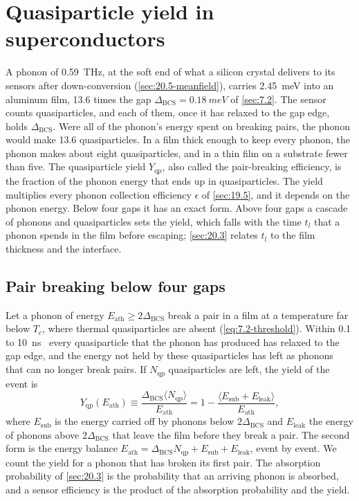 \section{Quasiparticle yield in superconductors}\label{sec:20.4}

A phonon of \SI{0.59}{THz}, at the soft end of what a silicon crystal delivers to its sensors after down-conversion (\cref{sec:20.5-meanfield}), carries \SI{2.45}{meV} into an aluminum film, 13.6 times the gap $\Delta_{\mathrm{BCS}} = \SI{0.18}{meV}$ of \cref{sec:7.2}. The sensor counts quasiparticles, and each of them, once it has relaxed to the gap edge, holds $\Delta_{\mathrm{BCS}}$. Were all of the phonon's energy spent on breaking pairs, the phonon would make 13.6 quasiparticles. In a film thick enough to keep every phonon, the phonon makes about eight quasiparticles, and in a thin film on a substrate fewer than five. The quasiparticle yield $Y_{\mathrm{qp}}$, also called the pair-breaking efficiency, is the fraction of the phonon energy that ends up in quasiparticles. The yield multiplies every phonon collection efficiency $\epsilon$ of \cref{sec:19.5}, and it depends on the phonon energy. Below four gaps it has an exact form. Above four gaps a cascade of phonons and quasiparticles sets the yield, which falls with the time $t_l$ that a phonon spends in the film before escaping; \cref{sec:20.3} relates $t_l$ to the film thickness and the interface.

\subsection{Pair breaking below four gaps}\label{sec:20.4-below}

Let a phonon of energy $E_{\mathrm{ath}} \ge 2\Delta_{\mathrm{BCS}}$ break a pair in a film at a temperature far below $T_c$, where thermal quasiparticles are absent (\cref{eq:7.2-threshold}). Within 0.1 to \SI{10}{ns}~\cite[p.~1]{guruswamy2014quasiparticle} every quasiparticle that the phonon has produced has relaxed to the gap edge, and the energy not held by these quasiparticles has left as phonons that can no longer break pairs. If $N_{\mathrm{qp}}$ quasiparticles are left, the yield of the event is
\begin{equation}
  Y_{\mathrm{qp}}(E_{\mathrm{ath}}) \equiv \frac{\Delta_{\mathrm{BCS}}\langle N_{\mathrm{qp}}\rangle}{E_{\mathrm{ath}}}
  = 1 - \frac{\langle E_{\mathrm{sub}} + E_{\mathrm{leak}}\rangle}{E_{\mathrm{ath}}} ,
  \label{eq:20.4-Y}
\end{equation}
where $E_{\mathrm{sub}}$ is the energy carried off by phonons below $2\Delta_{\mathrm{BCS}}$ and $E_{\mathrm{leak}}$ the energy of phonons above $2\Delta_{\mathrm{BCS}}$ that leave the film before they break a pair. The second form is the energy balance $E_{\mathrm{ath}} = \Delta_{\mathrm{BCS}}N_{\mathrm{qp}} + E_{\mathrm{sub}} + E_{\mathrm{leak}}$, event by event. We count the yield for a phonon that has broken its first pair. The absorption probability of \cref{sec:20.3} is the probability that an arriving phonon is absorbed, and a sensor efficiency is the product of the absorption probability and the yield.

